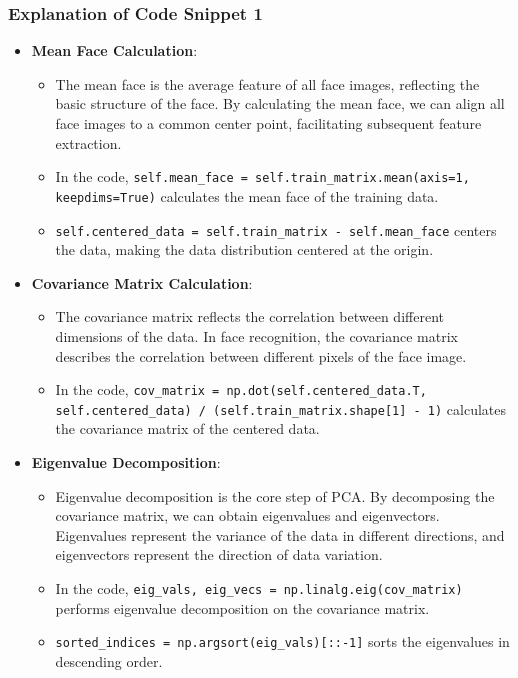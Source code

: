 \documentclass{article}
\begin{document}
\subsubsection{Explanation of Code Snippet 1}
\begin{itemize}
    \item \textbf{Mean Face Calculation}:
    \begin{itemize}
        \item The mean face is the average feature of all face images, reflecting the basic structure of the face. By calculating the mean face, we can align all face images to a common center point, facilitating subsequent feature extraction.
        \item In the code, \texttt{self.mean\_face = self.train\_matrix.mean(axis=1, keepdims=True)} calculates the mean face of the training data.
        \item \texttt{self.centered\_data = self.train\_matrix - self.mean\_face} centers the data, making the data distribution centered at the origin.
    \end{itemize}
    \item \textbf{Covariance Matrix Calculation}:
    \begin{itemize}
        \item The covariance matrix reflects the correlation between different dimensions of the data. In face recognition, the covariance matrix describes the correlation between different pixels of the face image.
        \item In the code, \texttt{cov\_matrix = np.dot(self.centered\_data.T, self.centered\_data) / (self.train\_matrix.shape[1] - 1)} calculates the covariance matrix of the centered data.
    \end{itemize}
    \item \textbf{Eigenvalue Decomposition}:
    \begin{itemize}
        \item Eigenvalue decomposition is the core step of PCA. By decomposing the covariance matrix, we can obtain eigenvalues and eigenvectors. Eigenvalues represent the variance of the data in different directions, and eigenvectors represent the direction of data variation.
        \item In the code, \texttt{eig\_vals, eig\_vecs = np.linalg.eig(cov\_matrix)} performs eigenvalue decomposition on the covariance matrix.
        \item \texttt{sorted\_indices = np.argsort(eig\_vals)[::-1]} sorts the eigenvalues in descending order.

\end{itemize}
\end{itemize}
\end{document}
